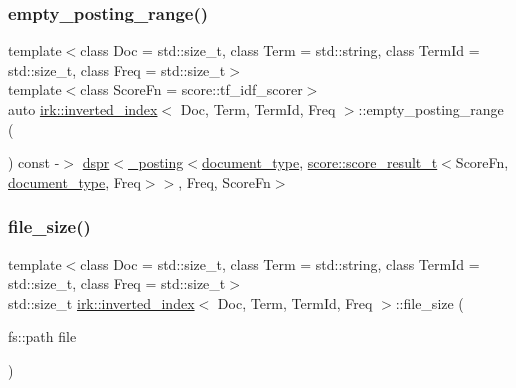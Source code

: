 \mbox{\label{classirk_1_1inverted__index_ae2401a96c224235b8efb4ca40c580f18}} 
\subsubsection{\texorpdfstring{empty\+\_\+posting\+\_\+range()}{empty\_posting\_range()}}
{\footnotesize\ttfamily template$<$class Doc  = std\+::size\+\_\+t, class Term  = std\+::string, class Term\+Id  = std\+::size\+\_\+t, class Freq  = std\+::size\+\_\+t$>$ \\
template$<$class Score\+Fn  = score\+::tf\+\_\+idf\+\_\+scorer$>$ \\
auto \mbox{\hyperlink{classirk_1_1inverted__index}{irk\+::inverted\+\_\+index}}$<$ Doc, Term, Term\+Id, Freq $>$\+::empty\+\_\+posting\+\_\+range (\begin{DoxyParamCaption}{ }\end{DoxyParamCaption}) const -\/$>$ \mbox{\hyperlink{namespaceirk_af92c7aae439f59ccae252f027f851c24}{dspr}}$<$\mbox{\hyperlink{structirk_1_1__posting}{\+\_\+posting}}$<$\mbox{\hyperlink{classirk_1_1inverted__index_ab708a9d1605de705341f3ed81bd7d5e7}{document\+\_\+type}},
                    \mbox{\hyperlink{namespaceirk_1_1score_af4a2c84b3548a4ac12aac3862bc94875}{score\+::score\+\_\+result\+\_\+t}}$<$Score\+Fn, \mbox{\hyperlink{classirk_1_1inverted__index_ab708a9d1605de705341f3ed81bd7d5e7}{document\+\_\+type}}, Freq$>$$>$,
            Freq,
            Score\+Fn$>$
    \hspace{0.3cm}{\ttfamily [inline]}}

\mbox{\label{classirk_1_1inverted__index_a06e5f0eb312766fe8ad96c054a9ec310}} 
\subsubsection{\texorpdfstring{file\+\_\+size()}{file\_size()}}
{\footnotesize\ttfamily template$<$class Doc  = std\+::size\+\_\+t, class Term  = std\+::string, class Term\+Id  = std\+::size\+\_\+t, class Freq  = std\+::size\+\_\+t$>$ \\
std\+::size\+\_\+t \mbox{\hyperlink{classirk_1_1inverted__index}{irk\+::inverted\+\_\+index}}$<$ Doc, Term, Term\+Id, Freq $>$\+::file\+\_\+size (\begin{DoxyParamCaption}\item[{fs\+::path}]{file }\end{DoxyParamCaption})\hspace{0.3cm}{\ttfamily [inline]}}

